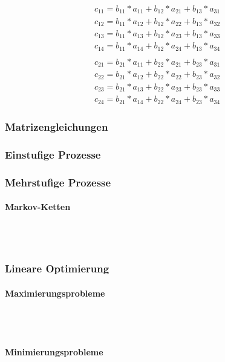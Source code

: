 \documentclass[a4paper]{article} %
\begin{document}
		\begin{align*}
		c_{11}=b_{11}*a_{11}+b_{12}*a_{21}+b_{13}*a_{31}\\
		c_{12}=b_{11}*a_{12}+b_{12}*a_{22}+b_{13}*a_{32}\\
		c_{13}=b_{11}*a_{13}+b_{12}*a_{23}+b_{13}*a_{33}\\
		c_{14}=b_{11}*a_{14}+b_{12}*a_{24}+b_{13}*a_{34}
		\\\\
		c_{21}=b_{21}*a_{11}+b_{22}*a_{21}+b_{23}*a_{31}\\
		c_{22}=b_{21}*a_{12}+b_{22}*a_{22}+b_{23}*a_{32}\\
		c_{23}=b_{21}*a_{13}+b_{22}*a_{23}+b_{23}*a_{33}\\
		c_{24}=b_{21}*a_{14}+b_{22}*a_{24}+b_{23}*a_{34}
		\end{align*}



	\subsubsection{Matrizengleichungen}


	\subsubsection{Einstufige Prozesse}
	\subsubsection{Mehrstufige Prozesse}
	\paragraph{Markov-Ketten}
	\hspace{0 cm} \\ \noindent \\
	\subsubsection{Lineare Optimierung}
	\paragraph{Maximierungsprobleme}
	 \hspace{0 cm} \\ \noindent \\
	\paragraph{Minimierungsprobleme}
	 \hspace{0 cm} \\ \noindent \\
\end{document}
